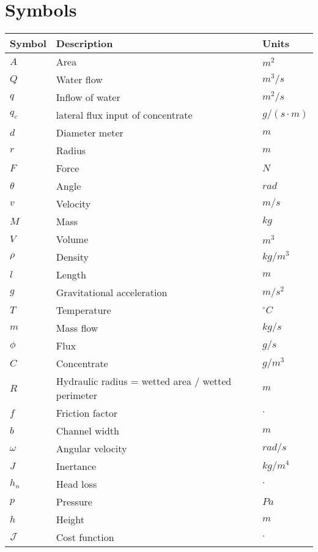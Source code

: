 \section*{Symbols}
\begin{longtable}[H]{p{80pt} p{280pt} p{50pt}} 
\textbf{Symbol}	& \textbf{Description} & \textbf{Units}  \\ \hline
$A$ 	& Area 				& $m^2$ \\ 
$Q$	 	& Water flow 		& $m^3/s$ \\
$q$	 	& Inflow of water 	& $m^2/s$ \\
$q_c$ 	& lateral flux input of concentrate & $g/(s\cdot m)$ \\
$d$ 	& Diameter meter 	& $m$ \\ 
$r$ 	& Radius 			& $m$ \\ 
$F$ 	& Force 			& $N$ \\ 
$\theta$ & Angle 			& $rad$ \\ 
$v$ 	& Velocity 			& $m/s$ \\ 
$M$ 	& Mass 				& $kg$ \\
$V$ 	& Volume 			& $m^3$ \\
$\rho$ 	& Density 			& $kg/m^3$ \\
$l$ 	& Length		 	& $m$ \\
$g$ 	& Gravitational acceleration & $m/s^2$ \\
$T$ 	& Temperature 		& $^{\circ}C$ \\
$m$ 	& Mass flow 		& $kg/s$ \\
$\phi$ 	& Flux 				& $g/s$ \\
$C$ 	& Concentrate 		& $g/m^3$ \\
$R$ 	& Hydraulic radius = wetted area / wetted perimeter & $m$ \\
$f$ 	& Friction factor 	& $\cdot$ \\
$b$ 	& Channel width 	& $m$ \\
$\omega$& Angular velocity	& $rad/s$ \\
$J$		& Inertance			& $kg/m^4$ \\
$h_n$	& Head loss			& $\cdot$ \\
$p$		& Pressure			& $Pa$ \\
$h$		& Height			& $m$ \\
$\CMcal{J}$& Cost function  & $\cdot$ \\

\end{longtable}


